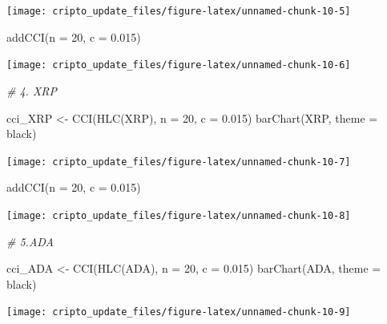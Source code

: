 \documentclass[]{tufte-handout}
\newenvironment{Shaded}{}{}
\newcommand{\AttributeTok}[1]{\textcolor[rgb]{0.49,0.56,0.16}{#1}}
\newcommand{\CommentTok}[1]{\textcolor[rgb]{0.38,0.63,0.69}{\textit{#1}}}
\newcommand{\DecValTok}[1]{\textcolor[rgb]{0.25,0.63,0.44}{#1}}
\newcommand{\FloatTok}[1]{\textcolor[rgb]{0.25,0.63,0.44}{#1}}
\newcommand{\FunctionTok}[1]{\textcolor[rgb]{0.02,0.16,0.49}{#1}}
\newcommand{\NormalTok}[1]{#1}
\newcommand{\OtherTok}[1]{\textcolor[rgb]{0.00,0.44,0.13}{#1}}
\newcommand{\StringTok}[1]{\textcolor[rgb]{0.25,0.44,0.63}{#1}}
\begin{document}
\texttt{[image: cripto\_update\_files/figure-latex/unnamed-chunk-10-5]}

\begin{Shaded}
\begin{Highlighting}[]
\FunctionTok{addCCI}\NormalTok{(}\AttributeTok{n =} \DecValTok{20}\NormalTok{, }\AttributeTok{c =} \FloatTok{0.015}\NormalTok{)}
\end{Highlighting}
\end{Shaded}

\texttt{[image: cripto\_update\_files/figure-latex/unnamed-chunk-10-6]}

\begin{Shaded}
\begin{Highlighting}[]
\CommentTok{\# 4. XRP}

\NormalTok{cci\_XRP }\OtherTok{\textless{}{-}} \FunctionTok{CCI}\NormalTok{(}\FunctionTok{HLC}\NormalTok{(XRP), }\AttributeTok{n =} \DecValTok{20}\NormalTok{, }\AttributeTok{c =} \FloatTok{0.015}\NormalTok{)}
\FunctionTok{barChart}\NormalTok{(XRP, }\AttributeTok{theme =} \StringTok{\textquotesingle{}black\textquotesingle{}}\NormalTok{)}
\end{Highlighting}
\end{Shaded}

\texttt{[image: cripto\_update\_files/figure-latex/unnamed-chunk-10-7]}

\begin{Shaded}
\begin{Highlighting}[]
\FunctionTok{addCCI}\NormalTok{(}\AttributeTok{n =} \DecValTok{20}\NormalTok{, }\AttributeTok{c =} \FloatTok{0.015}\NormalTok{)}
\end{Highlighting}
\end{Shaded}

\texttt{[image: cripto\_update\_files/figure-latex/unnamed-chunk-10-8]}

\begin{Shaded}
\begin{Highlighting}[]
\CommentTok{\# 5.ADA}

\NormalTok{cci\_ADA }\OtherTok{\textless{}{-}} \FunctionTok{CCI}\NormalTok{(}\FunctionTok{HLC}\NormalTok{(ADA), }\AttributeTok{n =} \DecValTok{20}\NormalTok{, }\AttributeTok{c =} \FloatTok{0.015}\NormalTok{)}
\FunctionTok{barChart}\NormalTok{(ADA, }\AttributeTok{theme =} \StringTok{\textquotesingle{}black\textquotesingle{}}\NormalTok{)}
\end{Highlighting}
\end{Shaded}

\texttt{[image: cripto\_update\_files/figure-latex/unnamed-chunk-10-9]}
\end{document}
